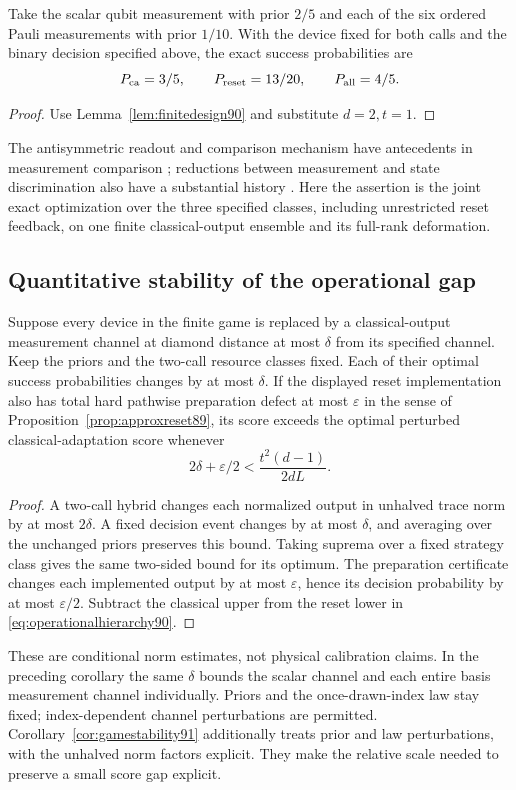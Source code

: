 \begin{corollary}\label{cor:qubitgame90}
Take the scalar qubit measurement with prior $2/5$ and each of the six
ordered Pauli measurements with prior $1/10$.  With the device fixed
for both calls and the binary decision specified above, the exact
success probabilities are
\[
 P_{\rm ca}=3/5,\qquad P_{\rm reset}=13/20,\qquad P_{\rm all}=4/5.
\]
\end{corollary}
\begin{proof}
Use Lemma~\ref{lem:finitedesign90} and substitute $d=2,t=1$.
\end{proof}
The antisymmetric readout and comparison mechanism have antecedents in
measurement comparison \cite{ZHS90}; reductions between measurement and
state discrimination also have a substantial history \cite{SZ74}.
Here the assertion is the joint exact optimization over the three
specified classes, including unrestricted reset feedback, on one finite
classical-output ensemble and its full-rank deformation.

\subsection{Quantitative stability of the operational gap}
\begin{corollary}\label{cor:robustgame90}
Suppose every device in the finite game is replaced by a classical-output
measurement channel at diamond distance at most $\delta$ from its
specified channel.  Keep the priors and the two-call resource classes
fixed.  Each of their optimal success probabilities changes by at most
$\delta$.  If the displayed reset implementation also has total hard
pathwise preparation defect at most $\varepsilon$ in the sense of
Proposition~\ref{prop:approxreset89}, its score exceeds the optimal
perturbed classical-adaptation score whenever
\begin{equation}\label{eq:robustgap90}
 2\delta+\varepsilon/2<\frac{t^2(d-1)}{2dL}.
\end{equation}
\end{corollary}
\begin{proof}
A two-call hybrid changes each normalized output in unhalved trace norm
by at most $2\delta$.  A fixed decision event changes by at most
$\delta$, and averaging over the unchanged priors preserves this bound.
Taking suprema over a fixed strategy class gives the same two-sided
bound for its optimum.  The preparation certificate changes each
implemented output by at most $\varepsilon$, hence its decision
probability by at most $\varepsilon/2$.  Subtract the classical upper
from the reset lower in \eqref{eq:operationalhierarchy90}.
\end{proof}
These are conditional norm estimates, not physical calibration claims.
In the preceding corollary the same $\delta$ bounds the scalar channel
and each entire basis measurement channel individually.  Priors and the
once-drawn-index law stay fixed; index-dependent channel perturbations
are permitted.  Corollary~\ref{cor:gamestability91} additionally treats
prior and law perturbations, with the unhalved norm factors explicit.
They make the relative scale needed to preserve a small score gap explicit.

